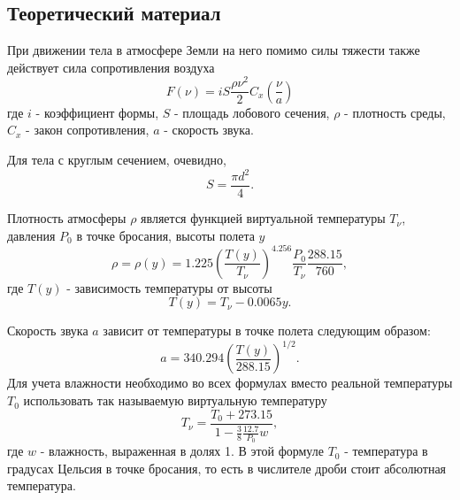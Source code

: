 \chapter{}

\section{Теоретический материал}
При движении тела в атмосфере Земли на него помимо силы тяжести также действует сила сопротивления воздуха
\begin{equation} \label{c13eq1}
	F(\nu) = i S \frac{\rho \nu^2}{2} C_x \left( \frac{\nu}{a} \right)
\end{equation}
где $i$ - коэффициент формы, $S$ - площадь лобового сечения, $\rho$ - плотность среды, $C_x$ - закон сопротивления, $a$ - скорость звука.

Для тела с круглым сечением, очевидно, 
\begin{equation} \label{c13eq2}
	S = \frac{\pi d^2}{4}.
\end{equation}

Плотность атмосферы $\rho$ является функцией виртуальной температуры $T_\nu$, давления $P_0$ в точке бросания, высоты полета $y$
\begin{equation} \label{c13eq3}
	\rho = \rho(y) = 1.225 \left( \frac{T(y)}{T_\nu} \right)^{4.256} \frac{P_0}{T_\nu} \frac{288.15}{760},
\end{equation}
где $T(y)$ - зависимость температуры от высоты
\begin{equation} \label{c13eq4}
	T(y) = T_\nu - 0.0065y.
\end{equation}

Скорость звука $a$ зависит от температуры в точке полета следующим образом:
\begin{equation} \label{c13eq5}
	a = 340.294 \left( \frac{T(y)}{288.15} \right)^{1/2}.
\end{equation}
Для учета влажности необходимо во всех формулах вместо реальной температуры $T_0$ использовать так называемую виртуальную температуру
\begin{equation} \label{c13eq6}
	T_\nu = \frac{T_0 + 273.15}{1 - \displaystyle \frac{3}{8} \frac{12.7}{P_0} w},
\end{equation}
где $w$ - влажность, выраженная в долях 1. В этой формуле $T_0$ - температура в градусах Цельсия в точке бросания, то есть в числителе дроби стоит абсолютная температура.

